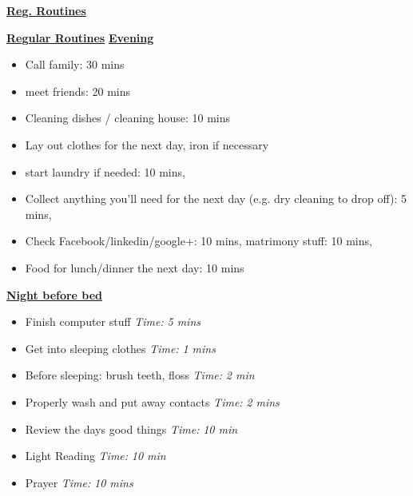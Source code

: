 \documentclass[serif,mathserif,final]{beamer}
\newcommand{\timeEst}[1]{\textit{Time:} \textit{#1}}
\begin{document}
\begin{frame}{}
\begin{columns}[t]
\begin{column}{0.27\linewidth} {\textbf{\underline{Reg. Routines}}}
\begin{block}{\small \textbf{\underline{Regular Routines}} }
\underline{\textbf{Evening}}

\begin{itemize}
\item \tiny Call family: 30 mins
\item \tiny meet friends: 20 mins
\item \tiny Cleaning dishes / cleaning house: 10 mins
\item \tiny Lay out clothes for the next day, iron if necessary
\item \tiny start laundry if needed: 10 mins,
\item \tiny Collect anything you’ll need for the next day (e.g. dry cleaning to drop off): 5 mins,
\item \tiny Check Facebook/linkedin/google+: 10 mins, matrimony stuff: 10 mins,
\item \tiny Food for lunch/dinner the next day: 10 mins
\end{itemize}

\underline{\textbf{Night before bed}}
\begin{itemize}
\item \tiny Finish computer stuff \timeEst{5 mins}
\item \tiny Get into sleeping clothes \timeEst{1 mins}
\item \tiny Before sleeping: brush teeth, floss \timeEst{ 2 min}
\item \tiny Properly wash and put away contacts \timeEst{ 2 mins}
\item \tiny Review the days good things \timeEst{ 10 min}
\item \tiny Light Reading \timeEst{ 10 min}
\item \tiny Prayer \timeEst{10 mins}
\end{itemize}
\end{block}

\end{column}%

\end{columns} 

\end{frame} 
\end{document}

